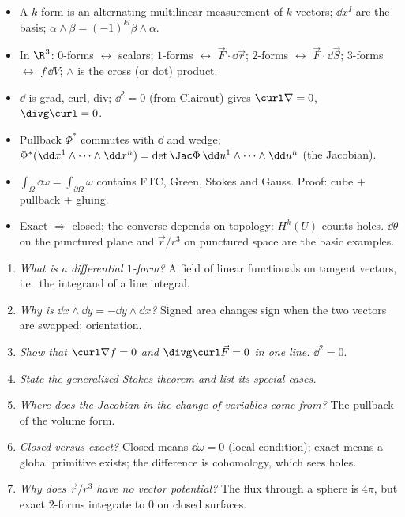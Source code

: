 \begin{summarybox}
\begin{itemize}
  \item A $k$-form is an alternating multilinear measurement of $k$ vectors; $\dd x^{I}$ are the basis; $\alpha\wedge\beta=(-1)^{kl}\beta\wedge\alpha$.
  \item In $\R^3$: $0$-forms $\leftrightarrow$ scalars; $1$-forms $\leftrightarrow$ $\vec F\cdot\dd\vec r$; $2$-forms $\leftrightarrow$ $\vec F\cdot\dd\vec S$; $3$-forms $\leftrightarrow$ $f\,\dd V$; $\wedge$ is the cross (or dot) product.
  \item $\dd$ is grad, curl, div; $\dd^2=0$ (from Clairaut) gives $\curl\nabla=0$, $\divg\curl=0$.
  \item Pullback $\Phi^*$ commutes with $\dd$ and wedge; $\Phi^*(\dd x^1\wedge\dots\wedge\dd x^n)=\det\Jac\Phi\,\dd u^1\wedge\dots\wedge\dd u^n$ (the Jacobian).
  \item $\int_\Omega\dd\omega=\int_{\partial\Omega}\omega$ contains FTC, Green, Stokes and Gauss. Proof: cube + pullback + gluing.
  \item Exact $\Rightarrow$ closed; the converse depends on topology: $H^k(U)$ counts holes. $\dd\theta$ on the punctured plane and $\vec r/r^3$ on punctured space are the basic examples.
\end{itemize}
\end{summarybox}

\begin{interview}
\begin{enumerate}
  \item \emph{What is a differential $1$-form?} A field of linear functionals on tangent vectors, i.e.\ the integrand of a line integral.
  \item \emph{Why is $\dd x\wedge\dd y=-\dd y\wedge\dd x$?} Signed area changes sign when the two vectors are swapped; orientation.
  \item \emph{Show that $\curl\nabla f=0$ and $\divg\curl\vec F=0$ in one line.} $\dd^2=0$.
  \item \emph{State the generalized Stokes theorem and list its special cases.}
  \item \emph{Where does the Jacobian in the change of variables come from?} The pullback of the volume form.
  \item \emph{Closed versus exact?} Closed means $\dd\omega=0$ (local condition); exact means a global primitive exists; the difference is cohomology, which sees holes.
  \item \emph{Why does $\vec r/r^3$ have no vector potential?} The flux through a sphere is $4\pi$, but exact $2$-forms integrate to $0$ on closed surfaces.
\end{enumerate}
\end{interview}

